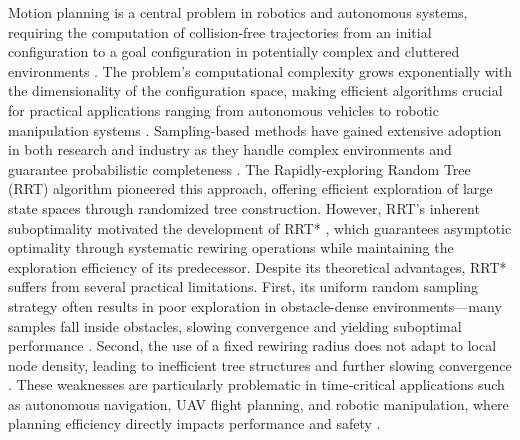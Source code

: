 \documentclass[pdflatex,sn-mathphys-num]{sn-jnl}
\theoremstyle{thmstyleone}%
\theoremstyle{thmstyletwo}%
\theoremstyle{thmstylethree}%
\begin{document}
Motion planning is a central problem in robotics and autonomous systems, requiring the computation of collision‑free trajectories from an initial configuration to a goal configuration in potentially complex and cluttered environments \cite{1, 2}. The problem's computational complexity grows exponentially with the dimensionality of the configuration space, making efficient algorithms crucial for practical applications ranging from autonomous vehicles to robotic manipulation systems \cite{3, 4, 5}. Sampling-based methods have gained extensive adoption in both research and industry as they handle complex environments and guarantee probabilistic completeness \cite{6}. The Rapidly-exploring Random Tree (RRT) algorithm \cite{7} pioneered this approach, offering efficient exploration of large state spaces through randomized tree construction. However, RRT's inherent suboptimality motivated the development of RRT* \cite{8}, which guarantees asymptotic optimality through systematic rewiring operations while maintaining the exploration efficiency of its predecessor. Despite its theoretical advantages, RRT* suffers from several practical limitations. First, its uniform random sampling strategy often results in poor exploration in obstacle-dense environments—many samples fall inside obstacles, slowing convergence and yielding suboptimal performance \cite{8, 9}. Second, the use of a fixed rewiring radius does not adapt to local node density, leading to inefficient tree structures and further slowing convergence \cite{10, 11}. These weaknesses are particularly problematic in time-critical applications such as autonomous navigation, UAV flight planning, and robotic manipulation, where planning efficiency directly impacts performance and safety \cite{12, 13}.
\end{document}
